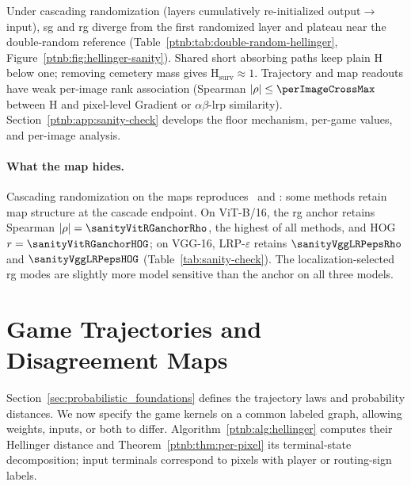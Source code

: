 Under cascading randomization (layers cumulatively re-initialized output$\to$input), \ac{sg} and \ac{rg} diverge from the first randomized layer and plateau near the double-random reference (Table~\ref{ptnb:tab:double-random-hellinger}, Figure~\ref{ptnb:fig:hellinger-sanity}). Shared short absorbing paths keep plain $\mathrm H$ below one; removing cemetery mass gives $\mathrm H_{\mathrm{surv}}\approx1$. Trajectory and map readouts have weak per-image rank association (Spearman $|\rho|\le\perImageCrossMax$ between $\mathrm H$ and pixel-level Gradient or $\alpha\beta$-\ac{lrp} similarity). Section~\ref{ptnb:app:sanity-check} develops the floor mechanism, per-game values, and per-image analysis.

\paragraph{What the map hides.}\label{ptnb:sec:pixel-sanity}
Cascading randomization on the maps reproduces~\textcite{Adebayo2018sanity} and \textcite{sixt2020whenexplanationslie}: some methods retain map structure at the cascade endpoint. On ViT-B/16, the \ac{rg} anchor retains Spearman $|\rho| = \sanityVitRGanchorRho$, the highest of all methods, and HOG $r = \sanityVitRGanchorHOG$; on VGG-16, LRP-$\varepsilon$ retains $\sanityVggLRPepsRho$ and $\sanityVggLRPepsHOG$ (Table~\ref{tab:sanity-check}). The localization-selected \ac{rg} modes are slightly more model sensitive than the anchor on all three models. 
\section{Game Trajectories and Disagreement Maps}\label{sec:trajectory_disagreement}

Section~\ref{sec:probabilistic_foundations} defines the trajectory laws and probability distances. We now specify the game kernels on a common labeled graph, allowing weights, inputs, or both to differ. Algorithm~\ref{ptnb:alg:hellinger} computes their Hellinger distance and Theorem~\ref{ptnb:thm:per-pixel} its terminal-state decomposition; input terminals correspond to pixels with player or routing-sign labels.


